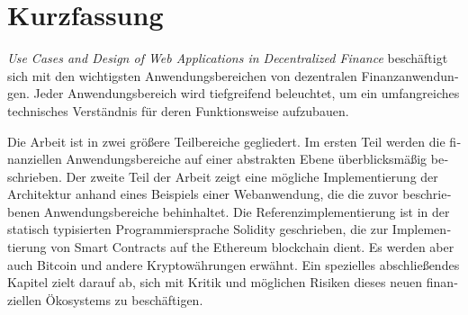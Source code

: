 \chapter{Kurzfassung}

\begin{german}
\textit{Use Cases and Design of Web Applications in Decentralized Finance} beschäftigt sich mit den wichtigsten Anwendungsbereichen von dezentralen
Finanzanwendungen. Jeder Anwendungsbereich wird tiefgreifend beleuchtet, um ein umfangreiches technisches Verständnis für deren Funktionsweise
aufzubauen.

Die Arbeit ist in zwei größere Teilbereiche gegliedert. Im ersten Teil werden die finanziellen Anwendungsbereiche auf einer abstrakten Ebene
überblicksmäßig beschrieben. Der zweite Teil der Arbeit zeigt eine mögliche Implementierung der Architektur anhand eines Beispiels einer Webanwendung,
die die zuvor beschriebenen Anwendungsbereiche behinhaltet. Die Referenzimplementierung ist in der statisch typisierten Programmiersprache Solidity
geschrieben, die zur Implementierung von Smart Contracts auf the Ethereum blockchain dient. Es werden aber auch Bitcoin und andere
Kryptowährungen erwähnt. Ein spezielles abschließendes Kapitel zielt darauf ab, sich mit Kritik und möglichen Risiken dieses neuen finanziellen
Ökosystems zu beschäftigen.
\end{german}